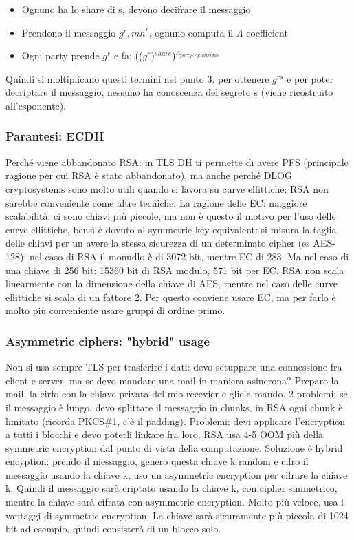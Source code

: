 \documentclass[16px]{article}
\begin{document}
\begin{itemize}
\item Ognuno ha lo share di s, devono decifrare il messaggio
\item Prendono il messaggio $g^r, mh^r$, ognuno computa il $\Lambda$ coefficient
\item Ogni party prende $g^r$ e fa: (($g^r$)$^{share}$)$^{\Lambda_{party//gli altri due}}$
\end{itemize}
Quindi si moltiplicano questi termini nel punto 3, per ottenere $g^{rs}$ e per poter decriptare il messaggio, nessuno ha conoscenza del segreto s (viene ricostruito all'esponente).
\subsubsection{Parantesi: ECDH}
Perché viene abbandonato RSA: in TLS DH ti permette di avere PFS (principale ragione per cui RSA è stato abbandonato), ma anche perché DLOG cryptosystems sono molto utili quando si lavora su curve ellittiche: RSA non sarebbe conveniente come altre tecniche. La ragione delle EC: maggiore scalabilità: ci sono chiavi più piccole, ma non è questo il motivo per l'uso delle curve ellittiche, bensì è dovuto al symmetric key equivalent: si misura la taglia delle chiavi per un avere la stessa sicurezza di un determinato cipher (es AES-128): nel caso di RSA il monudlo è di 3072 bit, mentre EC di 283. Ma nel caso di una chiave di 256 bit: 15360 bit di RSA modulo, 571 bit per EC. RSA non scala linearmente con la dimensione della chiave di AES, mentre nel caso delle curve ellittiche si scala di un fattore 2. Per questo conviene usare EC, ma per farlo è molto più conveniente usare gruppi di ordine primo.
\subsubsection{Asymmetric ciphers: "hybrid" usage}
Non si usa sempre TLS per trasferire i dati: devo setuppare una connessione fra client e server, ma se devo mandare una mail in maniera asincrona? Preparo la mail, la cirfo con la chiave privata del mio recevier e gliela mando. 2 problemi: se il messaggio è lungo, devo splittare il messaggio in chunks, in RSA ogni chunk è limitato (ricorda PKCS\#1, c'è il padding). Problemi: devi applicare l'encryption a tutti i blocchi e devo poterli linkare fra loro, RSA usa 4-5 OOM più della symmetric encryption dal punto di vista della computazione. Soluzione è hybrid encyption: prendo il messaggio, genero questa chiave k random e cifro il messaggio usando la chiave k, uso un asymmetric encryption per cifrare la chiave k. Quindi il messaggio sarà criptato usando la chiave k, con cipher simmetrico, mentre la chiave sarà cifrata con asymmetric encryption. Molto più veloce, usa i vantaggi di symmetric encryption. La chiave sarà sicuramente più piccola di 1024 bit ad esempio, quindi consisterà di un blocco solo.
\end{document}
